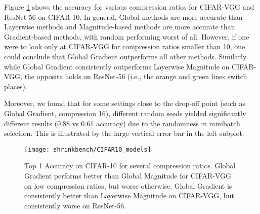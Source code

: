 Figure \ref{fig:sb_CIFAR10} shows the accuracy for various compression ratios for CIFAR-VGG \cite{vggCifarTorch} and ResNet-56 on CIFAR-10.
In general, Global methods are more accurate than Layerwise methods and Magnitude-based methods are more accurate than Gradient-based methods, with random performing worst of all.
However, if one were to look only at CIFAR-VGG for compression ratios smaller than 10, one could conclude that Global Gradient outperforms all other methods.
Similarly, while Global Gradient consistently outperforms Layerwise Magnitude on CIFAR-VGG, the opposite holds on ResNet-56 (i.e., the orange and green lines switch places).
%
%
%

Moreover, we found that for some settings close to the drop-off point (such as Global Gradient, compression 16), different random seeds yielded significantly different results (0.88 vs 0.61 accuracy) due to the randomness in minibatch selection. This is illustrated by the large vertical error bar in the left subplot.

\begin{figure}[h]
\begin{center}
\texttt{[image: shrinkbench/CIFAR10\_models]}
\caption{Top 1 Accuracy on CIFAR-10 for several compression ratios.
%
 Global Gradient performs better than Global Magnitude for CIFAR-VGG on low compression ratios, but worse otherwise.
 Global Gradient is consistently better than Layerwise Magnitude on CIFAR-VGG, but consistently worse on ResNet-56.
}
\label{fig:sb_CIFAR10}
\end{center}
\end{figure}


%
%

